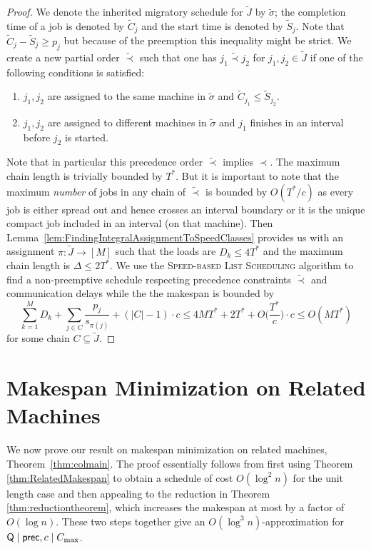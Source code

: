 \begin{proof}
    We denote the inherited migratory schedule for $\tilde{J}$ by $\tilde{\sigma}$; the completion time of a job is denoted by $\tilde{C}_j$ and the start time is denoted by $\tilde{S}_j$. Note that $\tilde{C}_j - \tilde{S}_j \geq p_j$
    but because of the preemption this inequality might be strict.
    We create a new partial order $\tilde{\prec}$ such that one has $j_1 \tilde{\prec} j_2$ for $j_1,j_2 \in \tilde{J}$ if one of the following conditions is satisfied:
    \begin{enumerate}
    \item $j_1,j_2$ are assigned to the same machine in $\tilde{\sigma}$ and $\tilde{C}_{j_1} \leq \tilde{S}_{j_2}$.
    \item $j_1,j_2$ are assigned to different machines in $\tilde{\sigma}$ and $j_1$ finishes in an interval before $j_2$ is started.
    \end{enumerate}
    Note that in particular this precedence order $\tilde{\prec}$ implies $\prec$. The maximum chain length
    is trivially bounded by $T^*$. But it is important to note that the maximum \emph{number} of jobs in
    any chain of $\tilde{\prec}$ is bounded by $O(T^*/c)$ as every job is either spread out and hence crosses an interval boundary or it is the unique compact job included in an interval (on that machine).
    Then Lemma~\ref{lem:FindingIntegralAssignmentToSpeedClasses} provides us with an assignment $\pi : \tilde{J} \to [M]$ such that the loads are $D_k \leq 4T^*$ and the maximum chain length is $\Delta \leq 2T^*$.
    We use the \textsc{Speed-based List Scheduling} algorithm to find a non-preemptive schedule respecting precedence constraints $\tilde{\prec}$ and communication delays while the the makespan is bounded by
    \[
     \sum_{k=1}^M D_k + \sum_{j \in C} \frac{p_j}{s_{\pi(j)}} + (|C|-1) \cdot c \leq 4MT^* + 2T^* + O\Big(\frac{T^*}{c}\Big) \cdot c \leq O(MT^*) 
    \]
  for some chain $C \subseteq \tilde{J}$.
  \end{proof}
  
  \section{Makespan Minimization on Related Machines}
  \label{sec:makespanformalproof}
  We now prove our result on makespan minimization on related machines, Theorem~\ref{thm:colmain}.
  The proof essentially follows from first using Theorem \ref{thm:RelatedMakespan} to obtain a schedule of cost $O(\log^2 n)$ for the unit length case and then appealing to the reduction in Theorem \ref{thm:reductiontheorem}, which increases the makespan at most by a factor of $O(\log n)$.  These two steps together give an $O(\log^3 n)$-approximation for  $\mathsf{Q} \mid \mathsf{prec}, c \mid C_{\max}$. 
  
